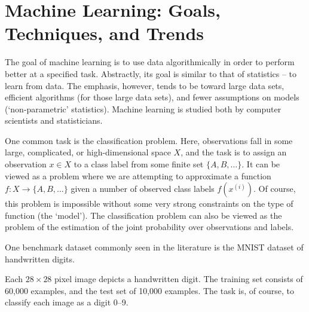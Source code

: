 \documentclass[11pt,titlepage]{article}
\begin{document}
\section{Machine Learning: Goals, Techniques, and Trends}

    The goal of machine learning is to use data algorithmically in order to
    perform better at a specified task.  Abstractly, its goal is similar to that
    of statistics -- to learn from data.  The emphasis, however, tends to be
    toward large data sets, efficient algorithms (for those large data sets),
    and fewer assumptions on models (`non-parametric' statistics).  Machine
    learning is studied both by computer scientists and statisticians.

    One common task is the classification problem.  Here, observations fall in
    some large, complicated, or high-dimensional space $X$, and the task is to
    assign an observation $x \in X$ to a class label from some finite set $\{A,
    B, \ldots \}$.  It can be viewed as a problem where we are attempting to
    approximate a function $f : X \to \{A, B, \ldots\}$ given a number of
    observed class labels $f(x^{(i)})$.  Of course, this problem is impossible
    without some very strong constraints on the type of function (the `model').
    The classification problem can also be viewed as the problem of the
    estimation of the joint probability over observations and labels.

    \begin{example} 
    One benchmark dataset commonly seen in the literature is the MNIST dataset
    of handwritten digits.
    \begin{center}
    \end{center}
    Each $28\times28$ pixel image depicts a handwritten digit.  The training set
    consists of 60,000 examples, and the test set of 10,000 examples.  The task
    is, of course, to classify each image as a digit 0--9.
    \end{example}
\end{document}
